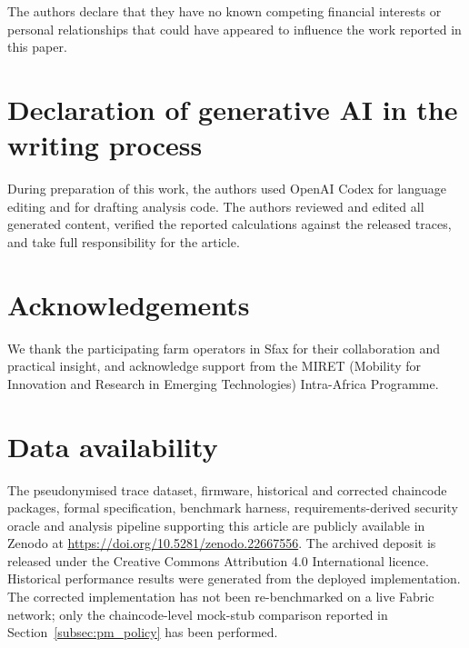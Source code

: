 \documentclass[a4paper,fleqn]{cas-dc}
\begin{document}
The authors declare that they have no known competing financial interests or
personal relationships that could have appeared to influence the work
reported in this paper.

\section*{Declaration of generative AI in the writing process}

During preparation of this work, the authors used OpenAI Codex for language
editing and for drafting analysis code. The authors reviewed and edited all
generated content, verified the reported calculations against the released
traces, and take full responsibility for the article.

\section*{Acknowledgements}

We thank the participating farm operators in Sfax for their collaboration and
practical insight, and acknowledge support from the MIRET (Mobility for
Innovation and Research in Emerging Technologies) Intra-Africa Programme.

\section*{Data availability}

The pseudonymised trace dataset, firmware, historical and corrected
chaincode packages, formal specification, benchmark harness,
requirements-derived security oracle and analysis pipeline supporting this
article are publicly available in Zenodo at
\url{https://doi.org/10.5281/zenodo.22667556}. The archived deposit is
released under the Creative Commons Attribution 4.0 International licence.
Historical performance results were generated from the deployed
implementation. The corrected implementation has not been re-benchmarked
on a live Fabric network; only the chaincode-level mock-stub comparison
reported in Section~\ref{subsec:pm_policy} has been performed.

\clearpage


\end{document}
